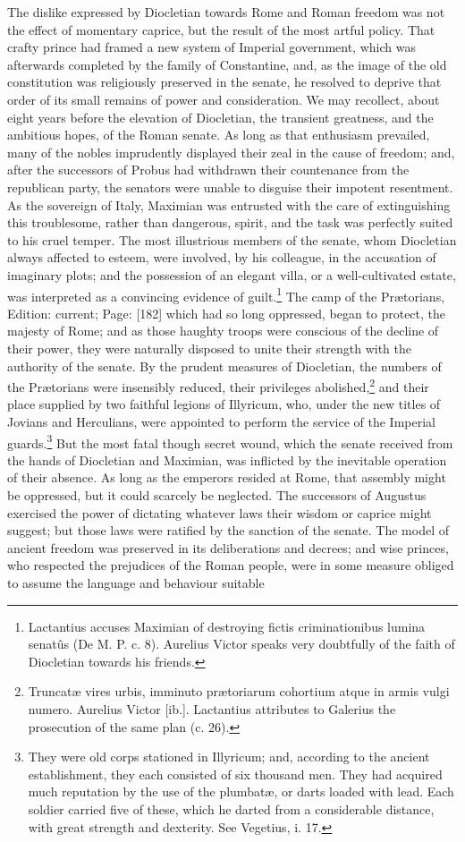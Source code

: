 The dislike expressed by Diocletian towards Rome and Roman freedom was not the effect of momentary caprice, but the result of the most artful policy. That crafty prince had framed a new system of Imperial government, which was afterwards completed by the family of Constantine, and, as the image of the old constitution was religiously preserved in the senate, he resolved to deprive that order of its small remains of power and consideration. We may recollect, about eight years before the elevation of Diocletian, the transient greatness, and the ambitious hopes, of the Roman senate. As long as that enthusiasm prevailed, many of the nobles imprudently displayed their zeal in the cause of freedom; and, after the successors of Probus had withdrawn their countenance from the republican party, the senators were unable to disguise their impotent resentment. As the sovereign of Italy, Maximian was entrusted with the care of extinguishing this troublesome, rather than dangerous, spirit, and the task was perfectly suited to his cruel temper. The most illustrious members of the senate, whom Diocletian always affected to esteem, were involved, by his colleague, in the accusation of imaginary plots; and the possession of an elegant villa, or a well-cultivated estate, was interpreted as a convincing evidence of guilt.\footnote{Lactantius accuses Maximian of destroying fictis criminationibus lumina senatûs (De M. P. c. 8). Aurelius Victor speaks very doubtfully of the faith of Diocletian towards his friends.} The camp of the Prætorians, Edition: current; Page: [182] which had so long oppressed, began to protect, the majesty of Rome; and as those haughty troops were conscious of the decline of their power, they were naturally disposed to unite their strength with the authority of the senate. By the prudent measures of Diocletian, the numbers of the Prætorians were insensibly reduced, their privileges abolished,\footnote{Truncatæ vires urbis, imminuto prætoriarum cohortium atque in armis vulgi numero. Aurelius Victor [ib.]. Lactantius attributes to Galerius the prosecution of the same plan (c. 26).} and their place supplied by two faithful legions of Illyricum, who, under the new titles of Jovians and Herculians, were appointed to perform the service of the Imperial guards.\footnote{They were old corps stationed in Illyricum; and, according to the ancient establishment, they each consisted of six thousand men. They had acquired much reputation by the use of the plumbatæ, or darts loaded with lead. Each soldier carried five of these, which he darted from a considerable distance, with great strength and dexterity. See Vegetius, i. 17.} But the most fatal though secret wound, which the senate received from the hands of Diocletian and Maximian, was inflicted by the inevitable operation of their absence. As long as the emperors resided at Rome, that assembly might be oppressed, but it could scarcely be neglected. The successors of Augustus exercised the power of dictating whatever laws their wisdom or caprice might suggest; but those laws were ratified by the sanction of the senate. The model of ancient freedom was preserved in its deliberations and decrees; and wise princes, who respected the prejudices of the Roman people, were in some measure obliged to assume the language and behaviour suitable 